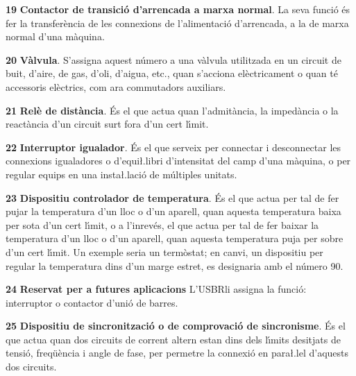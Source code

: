 \begin{multicols}{2}
\begin{list}{}
\item[\textbf{19}] 
\textbf{Contactor de transici\'{o} d'arrencada a marxa normal}. La seva
funci\'{o} \'{e}s fer la transfer\`{e}ncia de les connexions de l'alimentaci\'{o}
d'arrencada, a la de marxa normal d'una m\`{a}quina.

\item[\textbf{20}]  \textbf{V\`{a}lvula}. S'assigna aquest n\'{u}mero a una v\`{a}lvula
utilitzada en un circuit de buit, d'aire, de gas, d'oli, d'aigua,
etc., quan s'acciona el\`{e}ctricament o quan t\'{e} accessoris el\`{e}ctrics,
com ara commutadors auxiliars.

\item[\textbf{21}]  \textbf{Rel\`{e} de dist\`{a}ncia}. \'{E}s el que actua
quan l'admit\`{a}ncia, la imped\`{a}ncia o la react\`{a}ncia d'un circuit surt fora d'un cert l\'{\i}mit.

\item[\textbf{22}]  \textbf{Interruptor igualador}.  \'{E}s el
que serveix per connectar i desconnectar les connexions igualadores
o d'equi{\l.l}ibri d'intensitat del camp d'una m\`{a}quina, o per regular
equips en una  insta{\l.l}aci\'{o} de  m\'{u}ltiples unitats.

\item[\textbf{23}]  \textbf{Dispositiu
controlador de temperatura}. \'{E}s el que actua per tal de fer pujar la
temperatura d'un lloc o d'un aparell, quan aquesta temperatura baixa
per sota d'un cert l\'{\i}mit, o a l'inrev\'{e}s, el que actua per tal de fer
 baixar la temperatura d'un lloc o d'un aparell, quan aquesta
temperatura  puja per sobre d'un cert l\'{\i}mit. Un exemple seria un
term\`{o}stat; en canvi, un dispositiu per regular la temperatura dins
d'un marge estret, es designaria amb el n\'{u}mero 90.

\item[\textbf{24}] \textbf{Reservat per a  futures aplicacions}
L'\textsf{USBR}\footnotemark[1] li assigna la funci\'{o}: interruptor o
contactor d'uni\'{o} de barres.

\item[\textbf{25}]  \textbf{Dispositiu de sincronitzaci\'{o} o de comprovaci\'{o}
de sincronisme}. \'{E}s el que actua quan dos circuits de corrent altern
estan dins dels l\'{\i}mits desitjats de tensi\'{o}, freq\"{u}\`{e}ncia i angle de
fase, per permetre la connexi\'{o} en para{\l.l}el d'aquests dos circuits.



\end{list}
\end{multicols}
